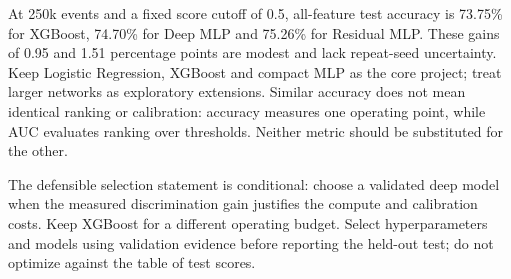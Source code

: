 \documentclass[11pt,a4paper]{article}
\begin{document}
At 250k events and a fixed score cutoff of 0.5, all-feature test accuracy is 73.75\% for XGBoost, 74.70\% for Deep MLP and 75.26\% for Residual MLP. These gains of 0.95 and 1.51 percentage points are modest and lack repeat-seed uncertainty. Keep Logistic Regression, XGBoost and compact MLP as the core project; treat larger networks as exploratory extensions. Similar accuracy does not mean identical ranking or calibration: accuracy measures one operating point, while AUC evaluates ranking over thresholds. Neither metric should be substituted for the other.

The defensible selection statement is conditional: choose a validated deep model when the measured discrimination gain justifies the compute and calibration costs. Keep XGBoost for a different operating budget. Select hyperparameters and models using validation evidence before reporting the held-out test; do not optimize against the table of test scores.
\end{document}
